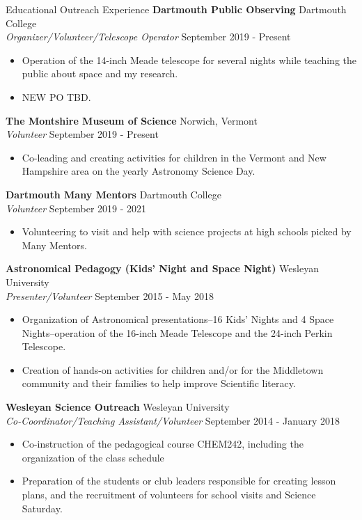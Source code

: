 \documentclass{resume} %
\begin{document}
\begin{rSection}{Educational Outreach Experience}
{\bf Dartmouth Public Observing} \hfill{Dartmouth College}\\
{\sl Organizer/Volunteer/Telescope Operator} \hfill September 2019 - Present
\begin{itemize} \itemsep -5pt
\item Operation of the 14-inch Meade telescope for several nights while teaching the public about space and my research.
\item NEW PO TBD.
\end{itemize}

{\bf The Montshire Museum of Science} \hfill{Norwich, Vermont}\\
{\sl Volunteer} \hfill September 2019 - Present
\begin{itemize} \itemsep -5pt
\item Co-leading and creating activities for children in the Vermont and New Hampshire area on the yearly Astronomy Science Day.
\end{itemize}

{\bf Dartmouth Many Mentors} \hfill{Dartmouth College}\\
{\sl Volunteer} \hfill September 2019 - 2021
\begin{itemize} \itemsep -5pt
\item Volunteering to visit and help with science projects at high schools picked by Many Mentors.
\end{itemize}

{\bf Astronomical Pedagogy (Kids' Night and Space Night)} \hfill{Wesleyan University}\\
{\sl Presenter/Volunteer} \hfill September 2015 - May 2018
\begin{itemize} \itemsep -5pt
\item Organization of Astronomical presentations--16 Kids' Nights and 4 Space Nights--operation of the 16-inch Meade Telescope and the 24-inch Perkin Telescope.
\item Creation of hands-on activities for children and/or for the Middletown community and their families to help improve Scientific literacy.
\end{itemize}

{\bf Wesleyan Science Outreach} \hfill{Wesleyan University} \\
{\sl Co-Coordinator/Teaching Assistant/Volunteer} \hfill September 2014 - January 2018
\begin{itemize} \itemsep -5pt
\item Co-instruction of the pedagogical course CHEM242, including the organization of the class schedule
\item Preparation of the students or club leaders responsible for creating lesson plans, and the recruitment of volunteers for school visits and Science Saturday.
\end{itemize}
\end{rSection}
\end{document}
